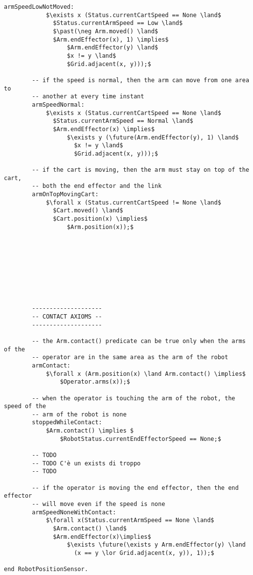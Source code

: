 \begin{lstlisting}[fontadjust, mathescape, frame=single]
        armSpeedLowNotMoved: 
            $\exists x (Status.currentCartSpeed == None \land$
              $Status.currentArmSpeed == Low \land$ 
              $\past(\neg Arm.moved() \land$
              $Arm.endEffector(x), 1) \implies$ 
                  $Arm.endEffector(y) \land$
                  $x != y \land$ 
                  $Grid.adjacent(x, y)));$

        -- if the speed is normal, then the arm can move from one area to 
        -- another at every time instant
        armSpeedNormal: 
            $\exists x (Status.currentCartSpeed == None \land$
              $Status.currentArmSpeed == Normal \land$
              $Arm.endEffector(x) \implies$
                  $\exists y (\future(Arm.endEffector(y), 1) \land$
                    $x != y \land$
                    $Grid.adjacent(x, y)));$

        -- if the cart is moving, then the arm must stay on top of the cart,
        -- both the end effector and the link
        armOnTopMovingCart: 
            $\forall x (Status.currentCartSpeed != None \land$
              $Cart.moved() \land$ 
              $Cart.position(x) \implies$
                  $Arm.position(x));$









        --------------------
        -- CONTACT AXIOMS --
        --------------------

        -- the Arm.contact() predicate can be true only when the arms of the 
        -- operator are in the same area as the arm of the robot
        armContact:
            $\forall x (Arm.position(x) \land Arm.contact() \implies$
                $Operator.arms(x));$

        -- when the operator is touching the arm of the robot, the speed of the
        -- arm of the robot is none
        stoppedWhileContact:
            $Arm.contact() \implies $
                $RobotStatus.currentEndEffectorSpeed == None;$

        -- TODO
        -- TODO C'è un exists di troppo
        -- TODO
                
        -- if the operator is moving the end effector, then the end effector 
        -- will move even if the speed is none
        armSpeedNoneWithContact: 
            $\forall x(Status.currentArmSpeed == None \land$
              $Arm.contact() \land$
              $Arm.endEffector(x)\implies$
                  $\exists \future(\exists y Arm.endEffector(y) \land 
                    (x == y \lor Grid.adjacent(x, y)), 1));$
        
end RobotPositionSensor.
\end{lstlisting}